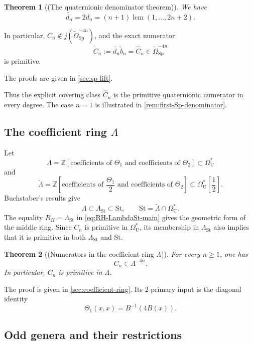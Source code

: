 \documentclass[14pt,dvipsnames]{extarticle}
\numberwithin{equation}{subsection}
\theoremstyle{plain}
\newtheorem{theorem}[theorem]{Theorem}
\theoremstyle{definition}
\theoremstyle{definition}
\DeclareMathOperator{\lcm}{lcm}
\newcommand{\OmU}{\Omega_{\mathrm U}^{\ast}}
\newcommand{\OmSpfree}{\widetilde{\Omega}_{\mathrm{Sp}}}
\newcommand{\St}{\mathrm{St}}
\newcommand{\LambdaSt}{\Lambda_{\mathrm{St}}}
\begin{document}
\begin{theorem}[(The quaternionic denominator theorem)]
\label{thm:sp-denominator}
We have
\begin{equation}\label{eq:Sp-lift-equivalences}
 \widetilde{d_n}=2d_n
 =(n+1)\lcm(1,\ldots,2n+2).
\end{equation}
\end{theorem}

In particular, $C_n\notin j(\OmSpfree^{-4n})$, and the exact numerator
\[
 \widetilde C_n:=\widetilde{d_n}\widetilde b_n
 =\widehat C_n\in\OmSpfree^{-4n}
\]
is primitive.

The proofs are given in \cref{sec:sp-lift}.

Thus the explicit covering class $\widehat C_n$ is the primitive quaternionic
numerator in every degree. The case $n=1$ is illustrated in
\cref{rem:first-Sp-denominator}.

\subsection{The coefficient ring \texorpdfstring{$\Lambda$}{Lambda}}

Let
\[
 \Lambda
 =\mathbb Z[\text{coefficients of }\Theta_1\text{ and }
                  \text{coefficients of }\Theta_2]
 \subset\OmU
\]
and
\[
 \widetilde\Lambda
 =\mathbb Z\left[
    \text{coefficients of }\frac{\Theta_1}{2}\text{ and }
    \text{coefficients of }\Theta_2
  \right]
 \subset\OmU\!\left[\frac12\right].
\]
Buchstaber's results
\cite[Theorems~4.1, 4.4, 5.13 and Lemma~6.6]{Buc78} give
\begin{equation}\label{eq:ring-hierarchy-main}
 \Lambda\subset\LambdaSt\subset\St,
 \qquad
 \St=\widetilde\Lambda\cap\OmU.
\end{equation}
The equality $R_H=\LambdaSt$ in \eqref{eq:RH-LambdaSt-main} gives the geometric
form of the middle ring. Since $C_n$ is primitive in $\OmU$, its membership in
$\LambdaSt$ also implies that it is primitive in both $\LambdaSt$ and $\St$.

\begin{theorem}[(Numerators in the coefficient ring $\Lambda$)]
\label{thm:Cn-Lambda}
For every $n\geq1$, one has
\[
 C_n\in\Lambda^{-4n}.
\]
In particular, $C_n$ is primitive in $\Lambda$.
\end{theorem}

The proof is given in \cref{sec:coefficient-ring}. Its $2$-primary input is the
diagonal identity
\[
 \Theta_1(x,x)=B^{-1}(4B(x)).
\]

\subsection{Odd genera and their restrictions}
\end{document}
